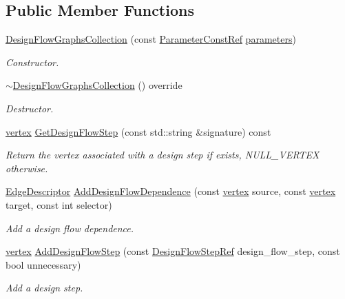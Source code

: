 \subsection*{Public Member Functions}
\begin{DoxyCompactItemize}
\item 
\hyperlink{classDesignFlowGraphsCollection_a8a9fa3c0c234c85ce301233af1bb9c8d}{Design\+Flow\+Graphs\+Collection} (const \hyperlink{Parameter_8hpp_a37841774a6fcb479b597fdf8955eb4ea}{Parameter\+Const\+Ref} \hyperlink{structgraphs__collection_adfc2ecaf0a04245a3cfd572c213ef1ed}{parameters})
\begin{DoxyCompactList}\small\item\em Constructor. \end{DoxyCompactList}\item 
\hyperlink{classDesignFlowGraphsCollection_adc5a533a4e858c61ba53163c23a368a2}{$\sim$\+Design\+Flow\+Graphs\+Collection} () override
\begin{DoxyCompactList}\small\item\em Destructor. \end{DoxyCompactList}\item 
\hyperlink{graph_8hpp_abefdcf0544e601805af44eca032cca14}{vertex} \hyperlink{classDesignFlowGraphsCollection_ad960e246ee04d5b39d48d58d63b875c3}{Get\+Design\+Flow\+Step} (const std\+::string \&signature) const
\begin{DoxyCompactList}\small\item\em Return the vertex associated with a design step if exists, N\+U\+L\+L\+\_\+\+V\+E\+R\+T\+EX otherwise. \end{DoxyCompactList}\item 
\hyperlink{graph_8hpp_a9eb9afea34e09f484b21f2efd263dd48}{Edge\+Descriptor} \hyperlink{classDesignFlowGraphsCollection_a03824b7b827aeb29bd51f97d3af75f30}{Add\+Design\+Flow\+Dependence} (const \hyperlink{graph_8hpp_abefdcf0544e601805af44eca032cca14}{vertex} source, const \hyperlink{graph_8hpp_abefdcf0544e601805af44eca032cca14}{vertex} target, const int selector)
\begin{DoxyCompactList}\small\item\em Add a design flow dependence. \end{DoxyCompactList}\item 
\hyperlink{graph_8hpp_abefdcf0544e601805af44eca032cca14}{vertex} \hyperlink{classDesignFlowGraphsCollection_abcc51a4113bec717c5ca63818d3543f9}{Add\+Design\+Flow\+Step} (const \hyperlink{design__flow__step_8hpp_a9dd6b4474ddf52d41a78b1aaa12ae6c8}{Design\+Flow\+Step\+Ref} design\+\_\+flow\+\_\+step, const bool unnecessary)
\begin{DoxyCompactList}\small\item\em Add a design step. \end{DoxyCompactList}\end{DoxyCompactItemize}

